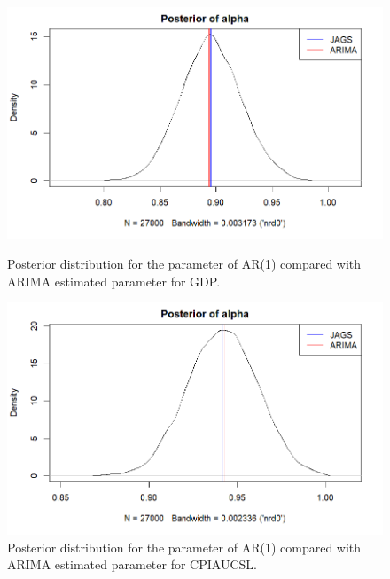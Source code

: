 \begin{figure}[H]
    \centering
    \begin{minipage}{0.49\textwidth}
        \centering
        \includegraphics[width=\textwidth]{images/2-AR/ARIMA_posterior_distribution_gdp.png}
        \caption{Posterior distribution for the parameter of AR(1) compared with ARIMA estimated parameter for GDP.}
        \label{fig:ARIMA_AR_gdp_posteriors}
    \end{minipage}\hfill
    \begin{minipage}{0.49\textwidth}
        \centering
        \includegraphics[width=\textwidth]{images/2-AR/ARIMA_posterior_distribution_infl.png}
        \caption{Posterior distribution for the parameter of AR(1) compared with ARIMA estimated parameter for CPIAUCSL.}
        \label{fig:ARIMA_AR_infl_posteriors}
    \end{minipage}
\end{figure}
